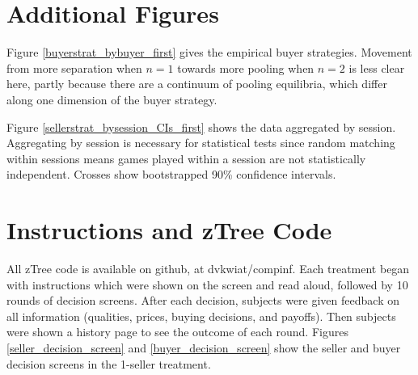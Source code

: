 \documentclass[12pt]{article}
\begin{document}


\newpage

\nocite{*}




\clearpage
\appendix





\section{Additional Figures}


%

Figure \ref{buyerstrat_bybuyer_first} gives the empirical buyer strategies. Movement from more separation when $n = 1$ towards more pooling when $n = 2$ is less clear here, partly because there are a continuum of pooling equilibria, which differ along one dimension of the buyer strategy.



Figure \ref{sellerstrat_bysession_CIs_first} shows the data aggregated by session. Aggregating by session is necessary for statistical tests since random matching within sessions means games played within a session are not statistically independent. Crosses show bootstrapped 90\% confidence intervals.






\section{Instructions and zTree Code}

All zTree code is available on github, at dvkwiat/compinf. Each treatment began with instructions which were shown on the screen and read aloud, followed by 10 rounds of decision screens. After each decision, subjects were given feedback on all information (qualities, prices, buying decisions, and payoffs). Then subjects were shown a history page to see the outcome of each round. Figures \ref{seller_decision_screen} and \ref{buyer_decision_screen} show the seller and buyer decision screens in the 1-seller treatment. 
\end{document}
